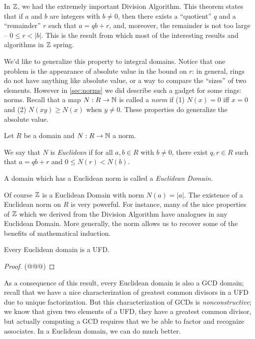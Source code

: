 In \(\mathbb{Z}\), we had the extremely important Division Algorithm. This theorem states that if \(a\) and \(b\) are integers with \(b \neq 0\), then there exists a ``quotient'' \(q\) and a ``remainder'' \(r\) such that \(a = qb + r\), and, moreover, the remainder is not too large -- \(0 \leq r < |b|\). This is the result from which most of the interesting results and algorithms in \(\mathbb{Z}\) spring.

We'd like to generalize this property to integral domains. Notice that one problem is the appearance of absolute value in the bound on \(r\): in general, rings do not have anything like absolute value, or a way to compare the ``sizes'' of two elements. However in \autoref{sec:norms} we did describe such a gadget for some rings: norms. Recall that a map \(N : R \rightarrow \mathbb{N}\) is called a \emph{norm} if (1) \(N(x) = 0\) iff \(x = 0\) and (2) \(N(xy) \geq N(x)\) when \(y \neq 0\). These properties do generalize the absolute value.

\begin{dfn}
Let \(R\) be a domain and \(N : R \rightarrow \mathbb{N}\) a norm.
\begin{proplist}
\item We say that \(N\) is \emph{Euclidean} if for all \(a,b \in R\) with \(b \neq 0\), there exist \(q,r \in R\) such that \(a = qb+r\) and \(0 \leq N(r) < N(b)\).
\item A domain which has a Euclidean norm is called a \emph{Euclidean Domain}.
\end{proplist}
\end{dfn}

Of course \(\mathbb{Z}\) is a Euclidean Domain with norm \(N(a) = |a|\). The existence of a Euclidean norm on \(R\) is very powerful. For instance, many of the nice properties of \(\mathbb{Z}\) which we derived from the Division Algorithm have analogues in any Euclidean Domain. More generally, the norm allows us to recover some of the benefits of mathematical induction.

\begin{prop}
Every Euclidean domain is a UFD.
\end{prop}

\begin{proof}
(@@@)
\end{proof}

As a consequence of this result, every Euclidean domain is also a GCD domain; recall that we have a nice characterization of greatest common divisors in a UFD due to unique factorization. But this characterization of GCDs is \emph{nonconstructive}; we know that given two elements of a UFD, they have a greatest common divisor, but actually computing a GCD requires that we be able to factor and recognize associates. In a Euclidean domain, we can do much better.

